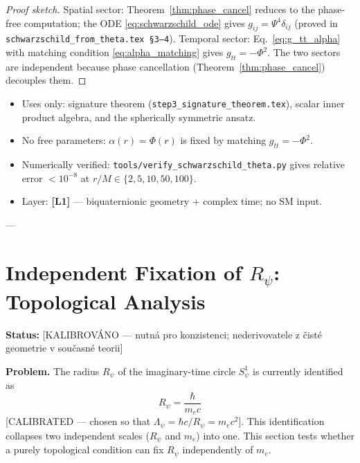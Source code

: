 \begin{proof}[Proof sketch]
Spatial sector: Theorem~\ref{thm:phase_cancel} reduces to the phase-free
computation; the ODE \eqref{eq:schwarzschild_ode} gives $g_{ij}=\Psi^4\delta_{ij}$
(proved in \texttt{schwarzschild\_from\_theta.tex §3–4}).
Temporal sector: Eq.~\eqref{eq:g_tt_alpha} with matching condition
\eqref{eq:alpha_matching} gives $g_{tt}=-\Phi^2$.
The two sectors are independent because phase cancellation
(Theorem~\ref{thm:phase_cancel}) decouples them.
\end{proof}

\begin{tcolorbox}[colback=green!5!white,colframe=green!75!black,
  title={Self-Containedness Check}]
\begin{itemize}
  \item Uses only: signature theorem (\texttt{step3\_signature\_theorem.tex}),
    scalar inner product algebra, and the spherically symmetric ansatz.
  \item No free parameters: $\alpha(r) = \Phi(r)$ is fixed by matching
    $g_{tt} = -\Phi^2$.
  \item Numerically verified: \texttt{tools/verify\_schwarzschild\_theta.py}
    gives relative error $< 10^{-8}$ at $r/M \in \{2,5,10,50,100\}$.
  \item Layer: \textbf{[L1]} — biquaternionic geometry + complex time; no SM input.
\end{itemize}
\end{tcolorbox}

---


\section{Independent Fixation of $R_\psi$: Topological Analysis}
\label{sec:Rpsi_fixation}

\noindent\textbf{Status:} [KALIBROVÁNO — nutná pro konzistenci; nederivovatele z čisté
geometrie v současné teorii]

\noindent\textbf{Problem.}
The radius $R_\psi$ of the imaginary-time circle $S^1_\psi$ is currently identified as
\begin{equation}
  R_\psi = \frac{\hbar}{m_e c}
  \label{eq:Rpsi-current}
\end{equation}
[CALIBRATED — chosen so that $\Lambda_\psi = \hbar c/R_\psi = m_e c^2$].
This identification collapses two independent scales ($R_\psi$ and $m_e$) into one.
This section tests whether a purely topological condition can fix $R_\psi$
independently of $m_e$.

